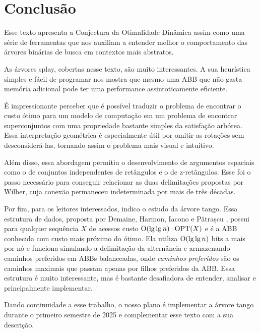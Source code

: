 
\chapter{Conclusão}
\label{cap:conclusao}

Esse texto apresenta a Conjectura da Otimalidade Dinâmica assim como uma série de ferramentas que nos auxiliam a entender melhor o comportamento das árvores binárias de busca em contextos mais abstratos.

As árvores splay, cobertas nesse texto, são muito interessantes. A sua heurística simples e fácil de programar nos mostra que mesmo uma ABB que não gasta memória adicional pode ter uma performance assintoticamente eficiente.

É impressionante perceber que é possível traduzir o problema de encontrar o custo ótimo para um modelo de computação em um problema de encontrar superconjuntos com uma propriedade bastante simples da satisfação arbórea. Essa interpretação geométrica é especialmente útil por omitir as rotações sem desconsiderá-las, tornando assim o problema  mais visual e intuitivo. 

Além disso, essa abordagem permitiu o desenvolvimento de argumentos espaciais como o de conjuntos independentes de retângulos e o de z-retângulos. Esse foi o passo necessário para conseguir relacionar as duas delimitações propostas por Wilber, cuja conexão permaneceu indeterminada por mais de três décadas.

Por fim, para os leitores interessados, indico o estudo da árvore tango. Essa estrutura de dados, proposta por Demaine, Harmon, Iacono e Pătrașcu  \cite{dynamicoptimality}, possui para qualquer sequência $X$ de acessos custo $\mathrm{O}(\lg \lg n) \cdot \mathrm{OPT}(X)$ e é a ABB conhecida com custo mais próximo do ótimo. Ela utiliza $\mathrm{O}(\lg \lg n)$ bits a mais por nó e funciona simulando a delimitação da alternância e armazenando caminhos preferidos em ABBs balanceadas, onde \textit{caminhos preferidos} são os caminhos maximais que passam apenas por filhos preferidos da ABB. Essa estrutura é muito interessante, mas é bastante desafiadora de entender, analisar e principalmente implementar. 

Dando continuidade a esse trabalho, o nosso plano é implementar a árvore tango durante o primeiro semestre de 2025 e complementar esse texto com a sua descrição.